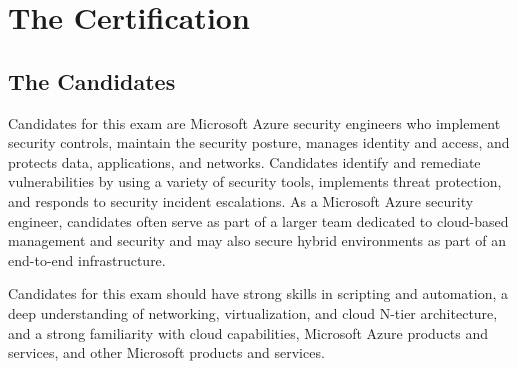 \section{The Certification}
\subsection{The Candidates}
Candidates for this exam are Microsoft Azure security engineers who implement security controls, maintain the security posture, manages identity and access, and protects data, applications, and networks. Candidates identify and remediate vulnerabilities by using a variety of security tools, implements threat protection, and responds to security incident escalations. As a Microsoft Azure security engineer, candidates often serve as part of a larger team dedicated to cloud-based management and security and may also secure hybrid environments as part of an end-to-end infrastructure.

Candidates for this exam should have strong skills in scripting and automation, a deep understanding of networking, virtualization, and cloud N-tier architecture, and a strong familiarity with cloud capabilities, Microsoft Azure products and services, and other Microsoft products and services.

